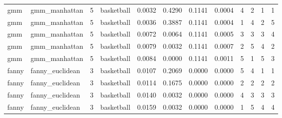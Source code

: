 {\begin{longtable}{| p{1cm} | p{1.8cm} | p{0.7cm} | p{0.9cm} | p{0.5cm} | p{0.65cm} | p{0.5cm} | p{0.5cm} | p{0.55cm} | p{0.55cm} | p{0.6cm} | p{0.5cm} |}
\cline{3-12}
\rowcolor{green} \scriptsize     gmm   & \scriptsize    gmm\_manhattan & \scriptsize    5    & \scriptsize basketball & \scriptsize    0.0032  &  \scriptsize 0.4290 & \scriptsize 0.1141 & \scriptsize    0.0004 & \scriptsize   4  & \scriptsize    2  & \scriptsize    1  & \scriptsize    1 \\
\scriptsize     gmm   & \scriptsize    gmm\_manhattan & \scriptsize    5    & \scriptsize basketball & \scriptsize    0.0036  &  \scriptsize 0.3887 & \scriptsize 0.1141 & \scriptsize    0.0004 & \scriptsize   1  & \scriptsize    4  & \scriptsize    2  & \scriptsize    5 \\
\scriptsize     gmm   & \scriptsize    gmm\_manhattan & \scriptsize    5    & \scriptsize basketball & \scriptsize    0.0072  &  \scriptsize 0.0064 & \scriptsize 0.1141 & \scriptsize    0.0005 & \scriptsize   3  & \scriptsize    3  & \scriptsize    3  & \scriptsize    4 \\
\scriptsize     gmm   & \scriptsize    gmm\_manhattan & \scriptsize    5    & \scriptsize basketball & \scriptsize    0.0079  &  \scriptsize 0.0032 & \scriptsize 0.1141 & \scriptsize    0.0007 & \scriptsize   2  & \scriptsize    5  & \scriptsize    4  & \scriptsize    2 \\
\scriptsize     gmm   & \scriptsize    gmm\_manhattan & \scriptsize    5    & \scriptsize basketball & \scriptsize    0.0084  &  \scriptsize 0.0000 & \scriptsize 0.1141 & \scriptsize    0.0011 & \scriptsize   5  & \scriptsize    1  & \scriptsize    5  & \scriptsize    3 \\
\cline{1-12}
\scriptsize   fanny   & \scriptsize  fanny\_euclidean & \scriptsize    3    & \scriptsize basketball & \scriptsize    0.0107  &  \scriptsize 0.2069 & \scriptsize 0.0000 & \scriptsize    0.0000 & \scriptsize   5  & \scriptsize    4  & \scriptsize    1  & \scriptsize    1 \\
\scriptsize   fanny   & \scriptsize  fanny\_euclidean & \scriptsize    3    & \scriptsize basketball & \scriptsize    0.0114  &  \scriptsize 0.1675 & \scriptsize 0.0000 & \scriptsize    0.0000 & \scriptsize   2  & \scriptsize    2  & \scriptsize    2  & \scriptsize    2 \\
\scriptsize   fanny   & \scriptsize  fanny\_euclidean & \scriptsize    3    & \scriptsize basketball & \scriptsize    0.0140  &  \scriptsize 0.0032 & \scriptsize 0.0000 & \scriptsize    0.0000 & \scriptsize   4  & \scriptsize    3  & \scriptsize    3  & \scriptsize    3 \\
\scriptsize   fanny   & \scriptsize  fanny\_euclidean & \scriptsize    3    & \scriptsize basketball & \scriptsize    0.0159  &  \scriptsize 0.0032 & \scriptsize 0.0000 & \scriptsize    0.0000 & \scriptsize   1  & \scriptsize    5  & \scriptsize    4  & \scriptsize    4 \\

\end{longtable}}
